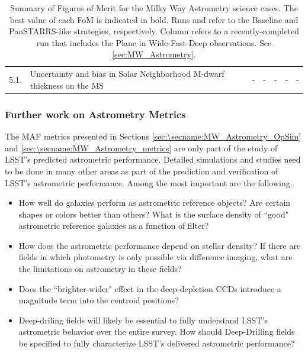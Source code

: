 \begin{table}
\begin{tabular}{l|p{4.8cm}|p{1.1cm}|p{1.1cm}|p{1.1cm}|c|p{3.5cm}}
    5.1. & \footnotesize{Uncertainty and bias in Solar Neighborhood M-dwarf thickness on the MS}  & - & - & - & - &  - \\
\end{tabular}
\caption{Summary of Figures of Merit for the Milky Way Astrometry science cases. The best value of each FoM is indicated in bold. Runs  and  refer to the Baseline and PanSTARRS-like strategies, respectively. Column  refers to a recently-completed \OpSim run that includes the Plane in Wide-Fast-Deep observations. See \autoref{sec:MW_Astrometry}.}
\label{tab_SummaryMWAstrometry}
\end{table}




\subsubsection{Further work on Astrometry Metrics}

The MAF metrics presented in Sections \ref{sec:\secname:MW_Astrometry_OpSim} and \ref{sec:\secname:MW_Astrometry_metrics} are only part of the
study of LSST's predicted astrometric performance.  Detailed simulations
and studies need to be done in many other areas as part of the
prediction and verification of LSST's astrometric performance.  Among
the most important are the following.
\begin{itemize}
\item How well do galaxies perform as astrometric reference objects? Are certain shapes or colors better than others? What is the
surface density of ``good" astrometric reference galaxies as a function of filter?
\item How does the astrometric performance depend on stellar density? If there are fields in which photometry is only possible via difference imaging, what are the limitations
on astrometry in these fields?
\item Does the ``brighter-wider" effect in the deep-depletion CCDs introduce a magnitude term into the centroid positions?

\item Deep-driling fields will likely be essential to fully understand LSST's astrometric behavior over the entire survey. How should Deep-Drilling fields be specified to fully characterize LSST's delivered astrometric performance?

\end{itemize}


